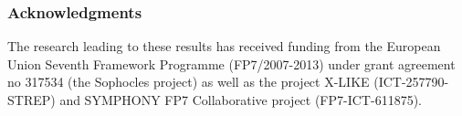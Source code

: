 \documentclass{article} %
\begin{document}
\subsubsection*{Acknowledgments}
The research leading to these results has received funding from the European Union Seventh Framework Programme (FP7/2007-2013) under grant agreement no 317534 (the Sophocles project) as well as the project X-LIKE (ICT-257790-STREP)\cite{xlike} and SYMPHONY FP7 Collaborative project (FP7-ICT-611875).




\end{document}

